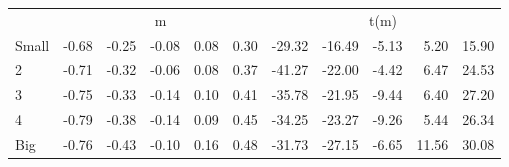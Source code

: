 \begin{table}[!ht]
\begin{tabular}{lrrrrrrrrrr}
  
     & \multicolumn{5}{c}{m} & \multicolumn{5}{c}{t(m)}   \\
     \cmidrule(r){2-6} \cmidrule(r){7-11} 
    Small  & -0.68  & -0.25  & -0.08  & 0.08  & 0.30  & -29.32  & -16.49  & -5.13  & 5.20  & 15.90   \\
    2  & -0.71  & -0.32  & -0.06  & 0.08  & 0.37  & -41.27  & -22.00  & -4.42  & 6.47  & 24.53   \\
    3  & -0.75  & -0.33  & -0.14  & 0.10  & 0.41  & -35.78  & -21.95  & -9.44  & 6.40  & 27.20   \\
    4  & -0.79  & -0.38  & -0.14  & 0.09  & 0.45  & -34.25  & -23.27  & -9.26  & 5.44  & 26.34   \\
    Big  & -0.76  & -0.43  & -0.10  & 0.16  & 0.48  & -31.73  & -27.15  & -6.65  & 11.56  & 30.08   \\
    
  
  \bottomrule
\end{tabular}
\label{tbl:25_Size_Prior_F17}
\end{table}